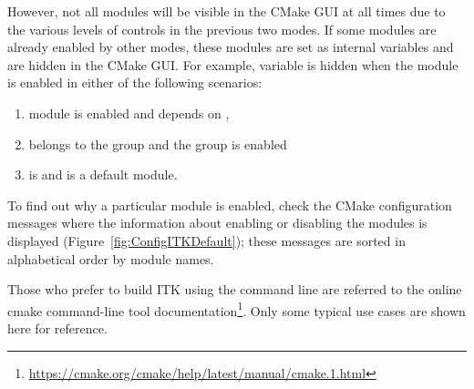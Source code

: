 However, not all modules will be visible in the CMake GUI at all times due to
the various levels of controls in the previous two modes. If some modules are
already enabled by other modes, these modules are set as internal variables and
are hidden in the CMake GUI. For example,  variable is
hidden when the module  is enabled in either of the following
scenarios:
\begin{enumerate}
\item module  is enabled and depends on ,
\item {} belongs to the group  and the
group is enabled
\item {} is  and  is a
default module.
\end{enumerate}

To find out why a particular module is enabled, check the CMake configuration
messages where the information about enabling or disabling the modules is
displayed (Figure~\ref{fig:ConfigITKDefault}); these messages are sorted in
alphabetical order by module names.

Those who prefer to build ITK using the command line are referred to the online
cmake command-line tool
documentation\footnote{\url{https://cmake.org/cmake/help/latest/manual/cmake.1.html}}.
Only some typical use cases are shown here for reference.

